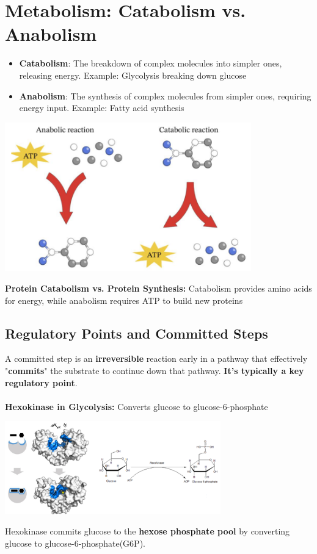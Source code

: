 \documentclass[10pt]{article}
\begin{document}
\section*{Metabolism: Catabolism vs. Anabolism}
\begin{itemize}
	\item \textbf{Catabolism}:  The breakdown of complex molecules into simpler ones, releasing energy.  Example: Glycolysis breaking down glucose
	\item \textbf{Anabolism}: The synthesis of complex molecules from simpler ones, requiring energy input.  Example: Fatty acid synthesis
\end{itemize}
\begin{center} 
	\includegraphics*[width=0.8\textwidth]{L2_1.png}
\end{center}
\textbf{Protein Catabolism vs. Protein Synthesis:}  Catabolism provides amino acids for energy, while anabolism requires ATP to build new proteins

\subsection*{Regulatory Points and Committed Steps}
A committed step is an \textbf{irreversible} reaction early in a pathway that effectively "\textbf{commits}" the substrate to continue down that pathway.  \textbf{It's typically a key regulatory point}.\\\\
\textbf{Hexokinase in Glycolysis:} Converts glucose to glucose-6-phosphate
\begin{center} 
	\includegraphics*[width=0.7\textwidth]{L2_2.png}
\end{center}
Hexokinase commits glucose to the \textbf{hexose phosphate pool} by converting glucose to glucose-6-phosphate(G6P).
\end{document}
